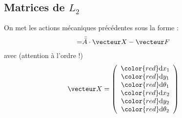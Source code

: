 \documentclass[a4paper,10pt]{article}
\renewcommand{\dx}[1]  {\ensuremath{{\color{red}\text{d}x_{#1}}}}
\renewcommand{\dy}[1]  {\ensuremath{{\color{red}\text{d}y_{#1}}}}
\renewcommand{\dtheta}[1]  {\ensuremath{{\color{red}\text{d}\theta_{#1}}}}
\begin{document}
	\subsection{Matrices de $L_2$}
	On met les actions mécaniques précédentes sous la forme :
        \begin{align}
                                =&\bar {\bar A}\cdot \vecteur X-\vecteur F
        \end{align}
avec (attention à l'ordre !)
    \begin{align*}
        \vecteur X  &=  \left(
                            \begin{array}{c}
                                \dx1\\\dy1\\\dtheta1\\\dx2\\\dy2\\\dtheta2
                            \end{array}
                        \right)
    \end{align*}
    
\end{document}

